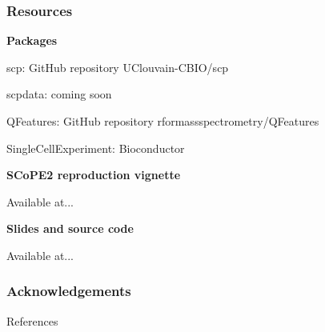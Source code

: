 \documentclass{beamer}
\newcommand{\hcode}[2][lgray]{{\ttfamily\color{vdgray}\colorbox{#1}{#2}}}
\newcommand{\frametitlesection}[1]{\frametitle{\centering #1 \footnotesize \hspace{0pt plus 1 filll} \insertsection}}
\begin{document}
\begin{frame}
    \frametitlesection{Resources}
    
    \textbf{Packages}
    
    \begin{itemize}
        \item{\hcode{scp}: GitHub repository \hcode{UClouvain-CBIO/scp}}
        \item{\hcode{scpdata}: coming soon
        \item{\hcode{QFeatures}: GitHub repository \hcode{rformassspectrometry/QFeatures}}
        \item{\hcode{SingleCellExperiment}: Bioconductor}}
    \end{itemize}
    
    \bigskip
    
    \textbf{SCoPE2 reproduction vignette}
    
    Available at...
    
    \bigskip
    
    \textbf{Slides and source code}
    
    Available at...
    
\end{frame}

\begin{frame}
    \frametitlesection{Acknowledgements}
    
\end{frame}




\begin{frame}[allowframebreaks]{References}
  \scriptsize
  
  
\end{frame}
\end{document}
